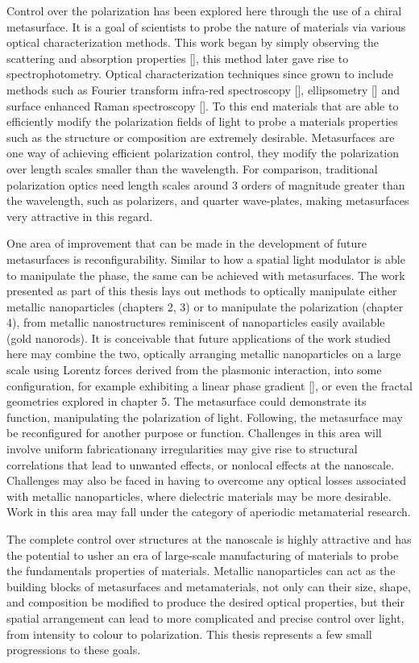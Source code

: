 Control over the polarization has been explored here through the use of a chiral metasurface. It is a goal of scientists to probe the nature of materials via various optical characterization methods. This work began by simply observing the scattering and absorption properties [\cite{Mie}], this method later gave rise to spectrophotometry. Optical characterization techniques since grown to include methods such as Fourier transform infra-red spectroscopy [\cite{Chan:2016}], ellipsometry [\cite{Theeten:1981}] and surface enhanced Raman spectroscopy [\cite{Wang:2015}]. To this end materials that are able to efficiently modify the polarization fields of light to probe a materials properties such as the structure or composition are extremely desirable. Metasurfaces are one way of achieving efficient polarization control, they modify the polarization over length scales smaller than the wavelength. For comparison, traditional polarization optics need length scales around 3 orders of magnitude greater than the wavelength, such as polarizers, and quarter wave-plates, making metasurfaces very attractive in this regard.

One area of improvement that can be made in the development of future metasurfaces is reconfigurability. Similar to how a spatial light modulator is able to manipulate the phase, the same can be achieved with metasurfaces. The work presented as part of this thesis lays out methods to optically manipulate either metallic nanoparticles (chapters 2, 3) or to manipulate the polarization (chapter 4), from metallic nanostructures reminiscent of nanoparticles easily available (gold nanorods). It is conceivable that future applications of the work studied here may combine the two, optically arranging metallic nanoparticles on a large scale using Lorentz forces derived from the plasmonic interaction, into some configuration, for example exhibiting a linear phase gradient [\cite{Aieta}], or even the fractal geometries explored in chapter 5. The metasurface could demonstrate its function, manipulating the polarization of light. Following, the metasurface may be reconfigured for another purpose or function. Challenges in this area will involve uniform fabrication\textemdash any irregularities may give rise to structural correlations that lead to unwanted effects, or nonlocal effects at the nanoscale. Challenges may also be faced in having to overcome any optical losses associated with metallic nanoparticles, where dielectric materials may be more desirable. Work in this area may fall under the category of aperiodic metamaterial research.

The complete control over structures at the nanoscale is highly attractive and has the potential to usher an era of large-scale manufacturing of materials to probe the fundamentals properties of materials. Metallic nanoparticles can act as the building blocks of metasurfaces and metamaterials, not only can their size, shape, and composition be modified to produce the desired optical properties, but their spatial arrangement can lead to more complicated and precise control over light, from intensity to colour to polarization. This thesis represents a few small progressions to these goals.